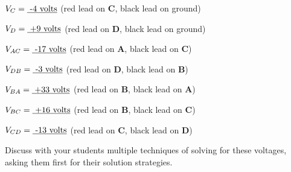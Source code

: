 $V_C = \hbox{\underbar{ -4 volts}}$ (red lead on {\bf C}, black lead on ground)

\vskip 5pt

$V_D = \hbox{\underbar{ +9 volts}}$ (red lead on {\bf D}, black lead on ground)

\vskip 20pt

\goodbreak

$V_{AC} = \hbox{\underbar{ -17 volts}}$ (red lead on {\bf A}, black lead on {\bf C})

\vskip 5pt

$V_{DB} = \hbox{\underbar{ -3 volts}}$ (red lead on {\bf D}, black lead on {\bf B})

\vskip 5pt

$V_{BA} = \hbox{\underbar{ +33 volts}}$ (red lead on {\bf B}, black lead on {\bf A})

\vskip 5pt

$V_{BC} = \hbox{\underbar{ +16 volts}}$ (red lead on {\bf B}, black lead on {\bf C})

\vskip 5pt

$V_{CD} = \hbox{\underbar{ -13 volts}}$ (red lead on {\bf C}, black lead on {\bf D})







Discuss with your students multiple techniques of solving for these voltages, asking them first for their solution strategies.




